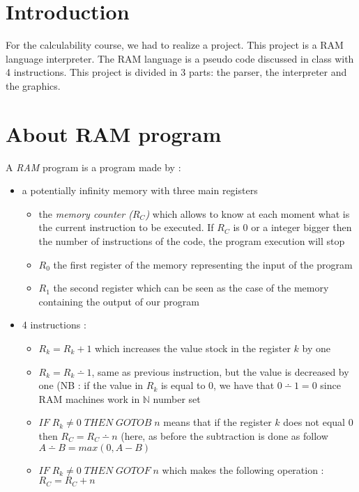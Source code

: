 \section{Introduction}
For the calculability course, we had to realize a project. This project is a RAM language interpreter. The RAM language is a pseudo code discussed in class with 4 instructions. This project is divided in 3 parts: the parser, the interpreter and the graphics.

\section{About RAM program}
\label{sec:RAM_intro}
A \textit{RAM} program is a program made by :
\begin{itemize}
    \item a potentially infinity memory with three main registers
    \begin{itemize}
        \item the \textit{memory counter ($R_C$)} which allows to know at each moment what is the current instruction to be executed. If $R_C$ is $0$ or a integer bigger then the number of instructions of the code, the program execution will stop 
        \item \textit{$R_0$} the first register of the memory representing the input of the program
        \item \textit{$R_1$} the second register which can be seen as the case of the memory containing the output of our program
    \end{itemize}
    \item 4 instructions :
    \begin{itemize}
        \item $R_k = R_k + 1$ which increases the value stock in the register $k$ by one
        \item $R_k = R_k \dotminus{} 1$, same as previous instruction, but the value is decreased by one (NB : if the value in $R_k$ is equal to 0, we have that $0 \dotminus{} 1 = 0$ since RAM machines work in $\mathbb{N}$ number set
        \item $IF \; R_k \neq 0 \; THEN \; GOTOB \; n$ means that if the register $k$ does not equal $0$ then $R_C = R_C \dotminus{} n$ (here, as before the subtraction is done as follow $A \dotminus{} B = max(0, A - B)$
        \item $IF \; R_k \neq 0 \; THEN \; GOTOF \; n$ which makes the following operation : $R_C = R_C + n$
    \end{itemize}
\end{itemize}

